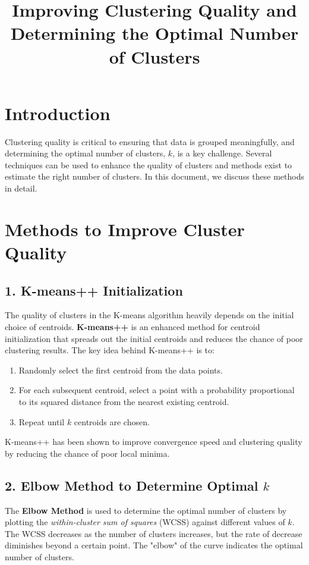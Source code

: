 \documentclass{article}
\title{Improving Clustering Quality and Determining the Optimal Number of Clusters}
\author{}
\date{}
\begin{document}
\maketitle

\section{Introduction}
Clustering quality is critical to ensuring that data is grouped meaningfully, and determining the optimal number of clusters, $k$, is a key challenge. Several techniques can be used to enhance the quality of clusters and methods exist to estimate the right number of clusters. In this document, we discuss these methods in detail.

\section{Methods to Improve Cluster Quality}

\subsection{1. K-means++ Initialization}
The quality of clusters in the K-means algorithm heavily depends on the initial choice of centroids. \textbf{K-means++} is an enhanced method for centroid initialization that spreads out the initial centroids and reduces the chance of poor clustering results. The key idea behind K-means++ is to:

\begin{enumerate}
    \item Randomly select the first centroid from the data points.
    \item For each subsequent centroid, select a point with a probability proportional to its squared distance from the nearest existing centroid.
    \item Repeat until $k$ centroids are chosen.
\end{enumerate}

K-means++ has been shown to improve convergence speed and clustering quality by reducing the chance of poor local minima.

\subsection{2. Elbow Method to Determine Optimal $k$}
The \textbf{Elbow Method} is used to determine the optimal number of clusters by plotting the \textit{within-cluster sum of squares} (WCSS) against different values of $k$. The WCSS decreases as the number of clusters increases, but the rate of decrease diminishes beyond a certain point. The "elbow" of the curve indicates the optimal number of clusters. 
\end{document}
